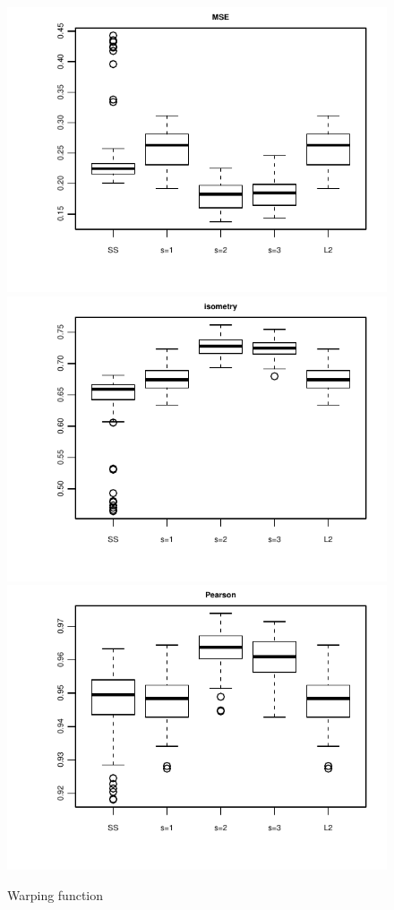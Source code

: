 \begin{figure}
\centering
\includegraphics[height=0.3\textheight]{sim_results/sce=5_SNR=high_Kobs=30_MSE}
\includegraphics[height=0.3\textheight]{sim_results/sce=5_SNR=high_Kobs=30_isometry}
\includegraphics[height=0.3\textheight]{sim_results/sce=5_SNR=high_Kobs=30_Pearson}
\caption{Warping function}
\label{fig:warping}
\end{figure}

